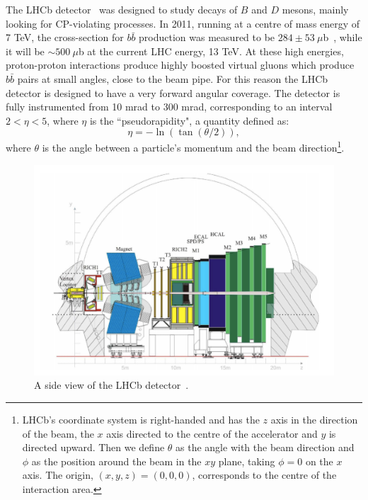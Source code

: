 The LHCb detector~\cite{Alves:2008zz} was designed to study decays of $B$ and $D$ mesons,
mainly looking for CP-violating processes. In 2011, running at a centre of mass energy of 7 TeV, 
the cross-section for $b\bar{b}$ production was measured to be $284 \pm 53 ~\mu$b~\cite{Aaij:2010gn}, 
while it will be $\sim500 ~\mu$b at the current LHC energy, 13 TeV.
At these high energies, proton-proton interactions produce highly boosted virtual gluons which produce $b\bar{b}$
pairs at small angles, close to the beam pipe. For this reason the LHCb detector is designed to have a very forward angular
coverage. The detector is fully instrumented from 10 mrad to 300 mrad, corresponding to an interval
$2 < \eta < 5$, where $\eta$ is the ``pseudorapidity", a quantity defined as:
\begin{equation}
\label{pseudorap}
\eta = - \ln(\tan(\theta/2)),
\end{equation}
where $\theta$ is the angle between a particle's momentum and the beam direction\footnote{LHCb's coordinate 
system is right-handed and has the $z$ axis in the direction of the beam, the $x$ axis directed to
the centre of the accelerator and $y$ is directed upward. Then we define $\theta$ as the angle with the beam
direction and $\phi$ as the position around the beam in the $xy$ plane, taking $\phi = 0$ on the $x$ axis.
The origin, $(x,y,z)=(0,0,0)$, corresponds to the centre of the interaction area.}.

\begin{figure}[h]
\includegraphics[width=1.\linewidth]{Detector/figs/LHCb_official.png}
\caption{A side view of the LHCb detector~\cite{Alves:2008zz}.}
\label{fig:lhcb}
\end{figure}

